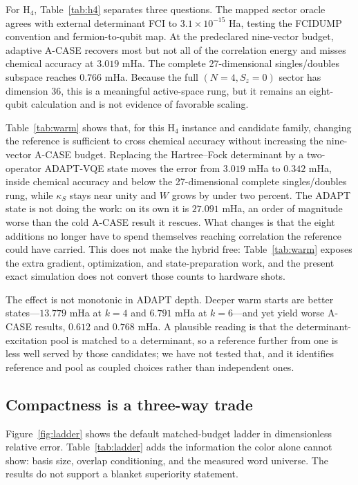 \documentclass[aps,pra,reprint,superscriptaddress,nofootinbib,floatfix]{revtex4-2}
\begin{document}
For H$_4$, Table~\ref{tab:h4} separates three questions.  The mapped sector
oracle agrees with external determinant FCI to $3.1\times10^{-15}$ Ha, testing
the FCIDUMP convention and fermion-to-qubit map.  At the predeclared
nine-vector budget, adaptive A-CASE recovers most but not all of the
correlation energy and misses chemical accuracy at $3.019$ mHa.  The complete
27-dimensional singles/doubles subspace reaches $0.766$ mHa.  Because the
full $(N=4,S_z=0)$ sector has dimension 36, this is a meaningful active-space
rung, but it remains an eight-qubit calculation and is not evidence of
favorable scaling.

Table~\ref{tab:warm} shows that, for this H$_4$ instance and candidate family,
changing the reference is sufficient to cross chemical accuracy without
increasing the nine-vector A-CASE budget.  Replacing the Hartree--Fock
determinant by a
two-operator ADAPT-VQE state moves the error from $3.019$ mHa to $0.342$ mHa,
inside chemical accuracy and below the 27-dimensional complete
singles/doubles rung, while $\kappa_S$ stays near unity and $W$ grows by under
two percent.  The ADAPT state is not doing the work: on its own it is
$27.091$ mHa, an order of magnitude worse than the cold A-CASE result it
rescues.  What changes is that the eight additions no longer have to spend
themselves reaching correlation the reference could have carried.  This does
not make the hybrid free: Table~\ref{tab:warm} exposes the extra gradient,
optimization, and state-preparation work, and the present exact simulation
does not convert those counts to hardware shots.

The effect is not monotonic in ADAPT depth.  Deeper warm starts are better
states---$13.779$ mHa at $k=4$ and $6.791$ mHa at $k=6$---and yet yield worse
A-CASE results, $0.612$ and $0.768$ mHa.  A plausible reading is that the
determinant-excitation pool is matched to a determinant, so a reference further
from one is less well served by those candidates; we have not tested that, and
it identifies reference and pool as coupled choices rather than independent
ones.

\subsection{Compactness is a three-way trade}
\label{sec:results-ladder}

Figure~\ref{fig:ladder} shows the default matched-budget ladder in dimensionless
relative error.  Table~\ref{tab:ladder} adds the information the color alone
cannot show: basis size, overlap conditioning, and the measured word universe.
The results do not support a blanket superiority statement.
\end{document}
